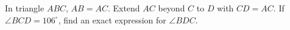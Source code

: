 In triangle $ABC$, $AB=AC$. Extend $AC$ beyond $C$ to $D$ with $CD=AC$. If $\angle BCD=106^\circ$, find an exact expression for $\angle BDC$.
